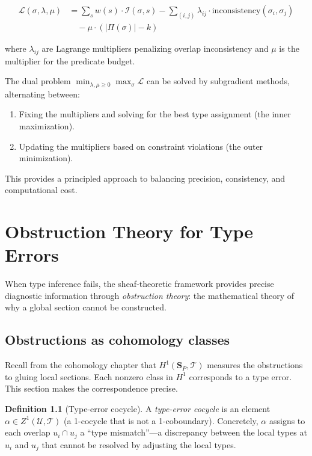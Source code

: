 \documentclass[11pt]{report}
\theoremstyle{definition}
\newtheorem{definition}{Definition}[section]
\theoremstyle{plain}
\begin{document}
\begin{align*}
  \mathcal{L}(\sigma, \lambda, \mu) &=
    \sum_s w(s) \cdot \mathcal{I}(\sigma, s)
    - \sum_{(i,j)} \lambda_{ij} \cdot
      \mathrm{inconsistency}(\sigma_i, \sigma_j) \\
    &\quad - \mu \cdot (|\Pi(\sigma)| - k)
\end{align*}

where $\lambda_{ij}$ are Lagrange multipliers penalizing overlap
inconsistency and $\mu$ is the multiplier for the predicate budget.

The dual problem $\min_{\lambda, \mu \geq 0} \max_\sigma \mathcal{L}$ can
be solved by subgradient methods, alternating between:
\begin{enumerate}[nosep]
  \item Fixing the multipliers and solving for the best type assignment
        (the inner maximization).
  \item Updating the multipliers based on constraint violations
        (the outer minimization).
\end{enumerate}

This provides a principled approach to balancing precision, consistency, and
computational cost.


\chapter{Obstruction Theory for Type Errors}

When type inference fails, the sheaf-theoretic framework provides precise
diagnostic information through \emph{obstruction theory}: the mathematical
theory of why a global section cannot be constructed.

\section{Obstructions as cohomology classes}

Recall from the cohomology chapter that $H^1(\mathbf{S}_P, \mathcal{T})$
measures the obstructions to gluing local sections. Each nonzero class in
$H^1$ corresponds to a type error. This section makes the correspondence
precise.

\begin{definition}[Type-error cocycle]
A \emph{type-error cocycle} is an element $\alpha \in Z^1(\mathcal{U},
\mathcal{T})$ (a 1-cocycle that is not a 1-coboundary). Concretely,
$\alpha$ assigns to each overlap $u_i \cap u_j$ a ``type mismatch''---a
discrepancy between the local types at $u_i$ and $u_j$ that cannot be
resolved by adjusting the local types.
\end{definition}
\end{document}
